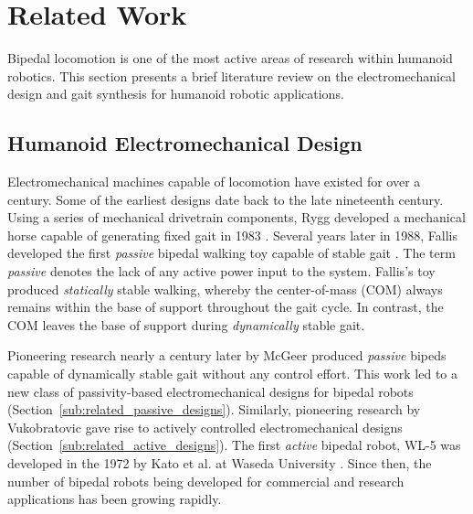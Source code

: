 \chapter{Related Work} %
\label{cha:background}
Bipedal locomotion is one of the most active areas of research within humanoid robotics. This section presents a brief literature review on the electromechanical design and gait synthesis for humanoid robotic applications. 






\section{Humanoid Electromechanical Design} %
\label{sec:related_electromechanical_design}
Electromechanical machines capable of locomotion have existed for over a century. Some of the earliest designs date back to the late nineteenth century. Using a series of mechanical drivetrain components, Rygg developed a mechanical horse capable of generating fixed gait in 1983 \cite{rygg1893mechanical}. Several years later in 1988, Fallis developed the first \emph{passive} bipedal walking toy capable of stable gait \cite{pallis1888fallis}. The term \emph{passive} denotes the lack of any active power input to the system. Fallis's toy produced \emph{statically} stable walking, whereby the center-of-mass (COM) always remains within the base of support throughout the gait cycle. In contrast, the COM leaves the base of support during \emph{dynamically} stable gait. 

Pioneering research nearly a century later by McGeer \cite{McGeer:1990uk} produced \emph{passive} bipeds capable of dynamically stable gait without any control effort. This work led to a new class of passivity-based electromechanical designs for bipedal robots (Section~\ref{sub:related_passive_designs}). Similarly, pioneering research by Vukobratovic \cite{vukobratovic1969} gave rise to actively controlled electromechanical designs (Section~\ref{sub:related_active_designs}). The first \emph{active} bipedal robot, WL-5 was developed in the 1972 by Kato et al. at Waseda University \cite{kato1972hydraulically}. Since then, the number of bipedal robots being developed for commercial and research applications has been growing rapidly.


